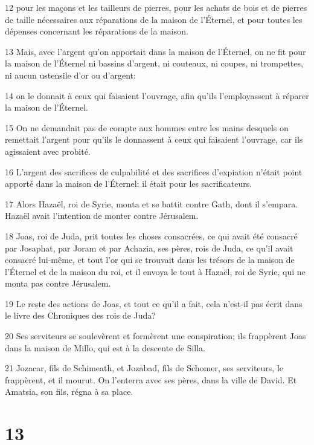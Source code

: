 \par 12 pour les maçons et les tailleurs de pierres, pour les achats de bois et de pierres de taille nécessaires aux réparations de la maison de l'Éternel, et pour toutes les dépenses concernant les réparations de la maison.
\par 13 Mais, avec l'argent qu'on apportait dans la maison de l'Éternel, on ne fit pour la maison de l'Éternel ni bassins d'argent, ni couteaux, ni coupes, ni trompettes, ni aucun ustensile d'or ou d'argent:
\par 14 on le donnait à ceux qui faisaient l'ouvrage, afin qu'ils l'employassent à réparer la maison de l'Éternel.
\par 15 On ne demandait pas de compte aux hommes entre les mains desquels on remettait l'argent pour qu'ils le donnassent à ceux qui faisaient l'ouvrage, car ils agissaient avec probité.
\par 16 L'argent des sacrifices de culpabilité et des sacrifices d'expiation n'était point apporté dans la maison de l'Éternel: il était pour les sacrificateurs.
\par 17 Alors Hazaël, roi de Syrie, monta et se battit contre Gath, dont il s'empara. Hazaël avait l'intention de monter contre Jérusalem.
\par 18 Joas, roi de Juda, prit toutes les choses consacrées, ce qui avait été consacré par Josaphat, par Joram et par Achazia, ses pères, rois de Juda, ce qu'il avait consacré lui-même, et tout l'or qui se trouvait dans les trésors de la maison de l'Éternel et de la maison du roi, et il envoya le tout à Hazaël, roi de Syrie, qui ne monta pas contre Jérusalem.
\par 19 Le reste des actions de Joas, et tout ce qu'il a fait, cela n'est-il pas écrit dans le livre des Chroniques des rois de Juda?
\par 20 Ses serviteurs se soulevèrent et formèrent une conspiration; ils frappèrent Joas dans la maison de Millo, qui est à la descente de Silla.
\par 21 Jozacar, fils de Schimeath, et Jozabad, fils de Schomer, ses serviteurs, le frappèrent, et il mourut. On l'enterra avec ses pères, dans la ville de David. Et Amatsia, son fils, régna à sa place.

\chapter{13}

